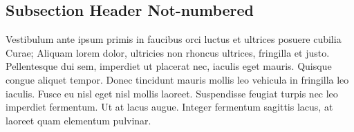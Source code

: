 \documentclass[]{article}
\begin{document}
		\subsection*{Subsection Header Not-numbered}
			Vestibulum ante ipsum primis in faucibus orci luctus et ultrices posuere cubilia Curae; Aliquam lorem dolor, ultricies non rhoncus ultrices, fringilla et justo. Pellentesque dui sem, imperdiet ut placerat nec, iaculis eget mauris. Quisque congue aliquet tempor. Donec tincidunt mauris mollis leo vehicula in fringilla leo iaculis. Fusce eu nisl eget nisl mollis laoreet. Suspendisse feugiat turpis nec leo imperdiet fermentum. Ut at lacus augue. Integer fermentum sagittis lacus, at laoreet quam elementum pulvinar.
		
\end{document}
